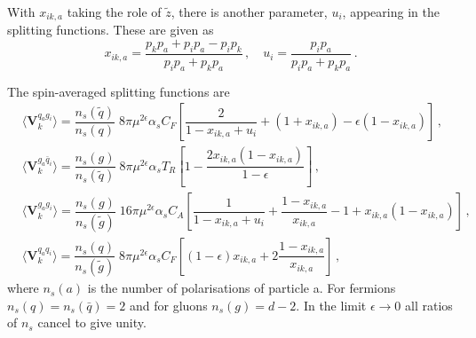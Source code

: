 \documentclass[main.tex]{subfiles}
\begin{document}
        With $x_{ik,a}$ taking the role of $\tilde{z}$, there is another
        parameter, $u_{i}$, appearing in the splitting functions.
        These are given as
        \begin{equation}\label{eqn:x_ika}
            x_{ik,a} = \dfrac{p_{k}p_{a}+p_{i}p_{a}-p_{i}p_{k}}{p_{i}p_{a} + p_{k}p_{a}} \, , \quad u_{i} = \dfrac{p_{i}p_{a}}{p_{i}p_{a} + p_{k}p_{a}} \, .
        \end{equation}

        The spin-averaged splitting functions are
        \begin{align}\label{eqn:V_aik}
            &\langle \boldsymbol{V}_{k}^{q_{a}g_{i}} \rangle = \dfrac{n_{s}(\tilde{q})}{n_{s}(q)} \; 8\pi \mu^{2\epsilon} \alpha_{s} C_{F} \left[\dfrac{2}{1-x_{ik,a} + u_{i}} + (1+x_{ik,a}) - \epsilon(1-x_{ik,a})\right] \, , \nonumber \\
            &\langle \boldsymbol{V}_{k}^{g_{a}\bar{q}_{i}} \rangle = \dfrac{n_{s}(g)}{n_{s}(\tilde{q})} \; 8\pi \mu^{2\epsilon} \alpha_{s} T_{R} \left[1 - \dfrac{2x_{ik,a}(1-x_{ik,a})}{1-\epsilon}\right] \, , \nonumber \\
            &\langle \boldsymbol{V}_{k}^{g_{a}g_{i}} \rangle = \dfrac{n_{s}(g)}{n_{s}(\tilde{g})} \; 16\pi \mu^{2\epsilon} \alpha_{s} C_{A} \left[\dfrac{1}{1-x_{ik,a} + u_{i}} + \dfrac{1-x_{ik,a}}{x_{ik,a}} - 1 + x_{ik,a}(1-x_{ik,a}) \right] \, , \nonumber \\
            &\langle \boldsymbol{V}_{k}^{q_{a}q_{i}} \rangle = \dfrac{n_{s}(q)}{n_{s}(\tilde{g})} \; 8\pi \mu^{2\epsilon} \alpha_{s} C_{F} \left[(1-\epsilon)x_{ik,a} + 2\dfrac{1-x_{ik,a}}{x_{ik,a}} \right] \, ,
        \end{align}
        where $n_{s}(a)$ is the number of polarisations of particle a.
        For fermions $n_{s}(q) = n_{s}(\bar{q}) = 2$
        and for gluons $n_{s}(g) = d-2$. In the limit $\epsilon \rightarrow 0$
        all ratios of $n_{s}$ cancel to give unity.
\end{document}
